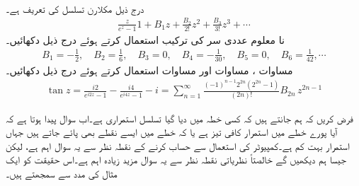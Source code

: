 \quad {}\\
درج ذیل مکلارن تسلسل   کی تعریف ہے۔
\begin{align}\label{مساوات_ٹیلر_برنولی_اعداد_تعریف}
\tfrac{z}{e^z-1}1+B_1z+\tfrac{B_2}{2!}z^2+\tfrac{B_3}{3!}z^3+\cdots
\end{align}
نا معلوم عددی سر کی ترکیب استعمال کرتے ہوئے درج ذیل دکھائیں۔
\begin{align}\label{مساوات_ٹیلر_برنولی_اعداد}
B_1=-\tfrac{1}{2},\quad B_2=\tfrac{1}{6},\quad B_3=0,\quad B_4=-\tfrac{1}{30},\quad B_5=0,\quad B_6=\tfrac{1}{42},\cdots
\end{align} 
\quad
مساوات ، مساوات  اور مساوات  استعمال کرتے ہوئے درج ذیل دکھائیں۔
\begin{align}
\tan z=\tfrac{i2}{e^{i2z}-1}-\tfrac{i4}{e^{i4z}-1}-i=\sum\limits_{n=1}^{\infty}  \tfrac{(-1)^{n-1}2^{2n} (2^{2n}-1)}{(2n)!} B_{2n} \, z^{2n-1}
\end{align}

فرض کریں کہ ہم جانتے ہیں کہ کسی خطہ  میں دیا گیا تسلسل استمراری ہے۔اب سوال پیدا ہوتا ہے کہ آیا پورے خطے میں استمرار کافی تیز ہے یا کہ خطے میں ایسے نقطے بھی پائے جاتے ہیں جہاں استمرار بہت کم  ہے۔کمپیوٹر کی استعمال سے حساب کرنے کے نقطہ نظر سے یہ سوال اہم ہے، لیکن جیسا ہم دیکھیں گے  خالصتاً نظریاتی نقطہ نظر سے یہ سوال مزید زیادہ اہم ہے۔اس حقیقت کو ایک مثال کی مدد سے سمجھتے ہیں۔

